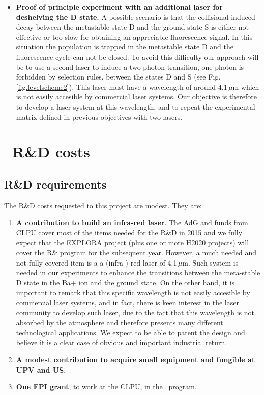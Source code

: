 \documentclass[a4paper,11pt,oneside]{article}
\begin{document}
\begin{itemize}
	\item \textbf{Proof of principle experiment with an additional laser for deshelving the D state.}
A possible scenario is that the collisional induced decay between the metastable state D and the ground state S is either not effective or too slow for obtaining an appreciable fluorescence signal. In this situation the population is trapped in the metastable state D  and the fluorescence cycle can not be closed. To avoid this difficulty our approach will be to use a second laser to induce a two photon transition, one photon is forbidden by selection rules, between the states D and S (see Fig.\,\ref{fig.levelscheme2}). This laser must have a wavelength of around 4.1\,$\mu$m which is not easily accesible by commercial laser systems. Our objective is therefore to develop a laser system at this wavelength, and to repeat the experimental matrix defined in previous objectives with two lasers.
	
\end{itemize}

\section{\BATA\ R\&D costs}
\label{bat.costs}

\subsection{R\&D requirements}
The R\&D costs requested to this project are modest. They are:
\begin{enumerate}
\item {\bf A contribution to build an infra-red laser}. The AdG and funds from CLPU cover most of the items needed for the R\&D in 2015 and we fully expect that the EXPLORA project (plus one or more H2020 projects) will cover the R\& program for the subsequent year. However, a much needed and not fully covered item is a a (infra-) red laser of 4.1\,$\mu$m. Such system is needed in our experiments to enhance the transitions between the meta-stable D state in the Ba+ ion and the ground state. On the other hand, it is important to remark that this specific wavelength is not easily accesible by  commercial laser systems, and in fact, there is keen interest in the laser community to develop such laser, due to the fact that this wavelength is not absorbed by the atmosphere and therefore presents many different technological applications. We expect to be able to patent the design and believe it is a clear case of obvious and important industrial return. 
\item {\bf A modest contribution to acquire small equipment and fungible at UPV and US}.
\item {\bf One FPI grant}, to work at the CLPU, in the \BATA\ program. 
\end{enumerate}
\end{document}
